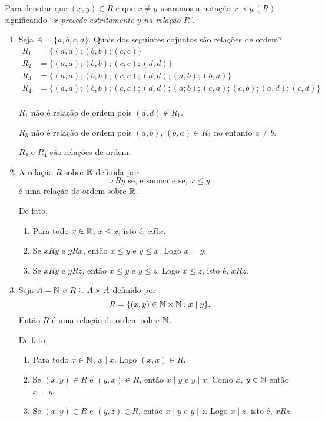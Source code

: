 Para denotar que $(x,y) \in R$ e que $x \ne y$ usaremos a notação $x \prec y\ (R)$ significando ``$x$ \textit{precede estritamente $y$ na relação $R$}''.

\begin{exemplos}\label{exemplos_relacoes_de_ordem}
	\begin{enumerate}[label={\arabic*})]
		\item Seja $A = \{a,b,c,d\}$. Quais dos seguintes cojuntos são relações de ordem?
		\begin{align*}
			R_1 &= \{(a,a);(b,b);(c,c)\}\\
			R_2 &= \{(a,a);(b,b);(c,c);(d,d)\}\\
			R_3 &= \{(a,a);(b,b);(c,c);(d,d);(a,b);(b,a)\}\\
			R_4 &= \{(a,a);(b,b);(c,c);(d,d);(a;b);(c,a);(c,b);(a,d);(c,d)\}\\
		\end{align*}
		\begin{solucao}
			$R_1$ não é relação de ordem pois $(d,d) \notin R_1$.

			$R_3$ não é relação de ordem pois $(a,b)$, $(b,a) \in R_3$ no entanto $a \ne b$.

			$R_2$ e $R_4$ são relações de ordem.
		\end{solucao}

		\item A relação $R$ sobre $\mathbb{R}$ definida por
		\[
			xRy \mbox{ se, e somente se, } x \leqslant y
		\]
		é uma relação de ordem sobre $\mathbb{R}$.
		\begin{solucao}
			De fato,
			\begin{enumerate}[label={\roman*})]
				\item Para todo $x \in \mathbb{R}$, $x \leqslant x$, isto é, $xRx$.
				\item Se $xRy$ e $yRx$, então $x \leqslant y$ e $y \leqslant x$. Logo $x = y$.
				\item Se $xRy$ e $yRz$, então $x \leqslant y$ e $y \leqslant z$. Logo $x \leqslant z$, isto é, $xRz$.
			\end{enumerate}
		\end{solucao}

		\item Seja $A = \mathbb{N}$ e $R \subseteq A \times A$ definido por
		\[
			R = \{(x,y) \in \mathbb{N} \times \mathbb{N} : x \mid y\}.
		\]
		Então $R$ é uma relação de ordem sobre $\mathbb{N}$.
		\begin{solucao}
			De fato,
			\begin{enumerate}[label={\roman*})]
				\item Para todo $x \in \mathbb{N}$, $x \mid x$. Logo $(x,x) \in R$.
				\item Se $(x,y)\in R$ e $(y,x) \in R$, então $x \mid y$ e $y \mid x$. Como $x$, $y \in \mathbb{N}$ então $x = y$.
				\item Se $(x,y) \in R$ e $(y,z) \in R$, então $x \mid y$ e $y \mid z$. Logo $x \mid z$, isto é, $xRz$.
			\end{enumerate}
		\end{solucao}
	\end{enumerate}
\end{exemplos}

